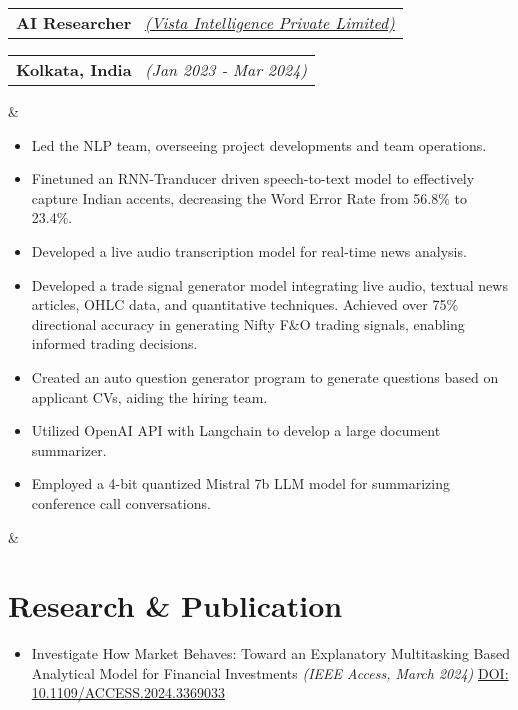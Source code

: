 \documentclass[11pt,a4paper,sans]{moderncv}
\makeatletter
\newcommand*{\customcventry}[7][.13em]{
\begin{tabular}{@{}l}
{\bfseries #4} \
{\itshape #3}
\end{tabular}
\hfill
\begin{tabular}{l@{}}
{\bfseries #5} \
{\itshape #2}
\end{tabular}
\ifx&#7&%
\else{\
\begin{minipage}{\maincolumnwidth}%
\small#7%
\end{minipage}}\fi%
\par\addvspace{#1}}
\makeatother
\begin{document}
\customcventry{(Jan 2023 ‐ Mar 2024)}{{\color{blue}\href{https://feedsense.vistaintelligence.ai/}{(Vista Intelligence Private Limited)}}}{AI Researcher}{Kolkata, 
India}{}{
{\begin{itemize}[leftmargin=0.6cm, label={\textbullet}]
\item Led the NLP team, overseeing project developments and team operations.
\item Finetuned an RNN-Tranducer driven speech-to-text model to effectively capture Indian accents, decreasing the Word Error Rate from 56.8\% to 23.4\%.
\item Developed a live audio transcription model for real-time news analysis.
\item Developed a trade signal generator model integrating live audio, textual news articles, OHLC data, and quantitative techniques. Achieved over 75\% directional accuracy in generating Nifty F\&O trading signals, enabling informed trading decisions.
\item Created an auto question generator program to generate questions based on applicant CVs, aiding the hiring team.
\item Utilized OpenAI API with Langchain to develop a large document summarizer.
\item Employed a 4-bit quantized Mistral 7b LLM model for summarizing conference call conversations.
\end{itemize}}}


\section{Research \& Publication}
{\begin{itemize}[label=\textbullet]
    \item Investigate How Market Behaves: Toward an Explanatory Multitasking Based Analytical Model for Financial Investments \textit{(IEEE Access, March 2024)} \color{blue}\href{DOI: 10.1109/ACCESS.2024.3369033}{DOI: 10.1109/ACCESS.2024.3369033}
\end{itemize}}
\end{document}
